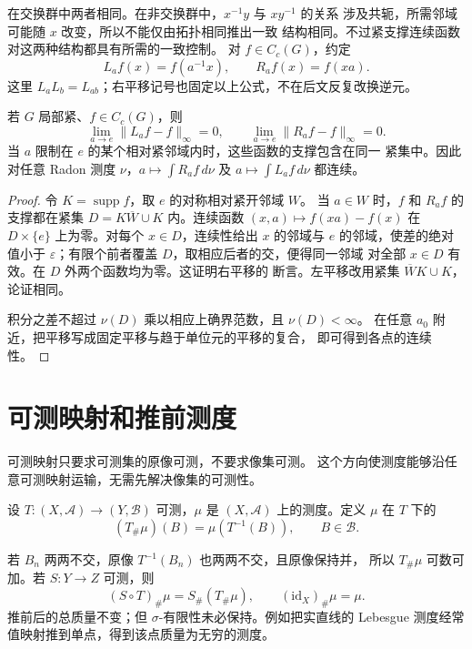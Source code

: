 在交换群中两者相同。在非交换群中，$x^{-1}y$ 与 $xy^{-1}$ 的关系
涉及共轭，所需邻域可能随 $x$ 改变，所以不能仅由拓扑相同推出一致
结构相同。不过紧支撑连续函数对这两种结构都具有所需的一致控制。
对 $f\in C_c(G)$，约定
\[
 L_af(x)=f(a^{-1}x),\qquad R_af(x)=f(xa).
\]
这里 $L_aL_b=L_{ab}$；右平移记号也固定以上公式，不在后文反复改换逆元。

\begin{lemma}[平移的一致连续性]
\label{lem:haar-translation-continuity}
若 $G$ 局部紧、$f\in C_c(G)$，则
\[
 \lim_{a\to e}\|L_af-f\|_\infty=0,
 \qquad \lim_{a\to e}\|R_af-f\|_\infty=0.
\]
当 $a$ 限制在 $e$ 的某个相对紧邻域内时，这些函数的支撑包含在同一
紧集中。因此对任意 Radon 测度 $\nu$，$a\mapsto\int R_af\,d\nu$
及 $a\mapsto\int L_af\,d\nu$ 都连续。
\end{lemma}

\begin{proof}
令 $K=\operatorname{supp}f$，取 $e$ 的对称相对紧开邻域 $W$。
当 $a\in W$ 时，$f$ 和 $R_af$ 的支撑都在紧集
$D=K\overline W\cup K$ 内。连续函数
$(x,a)\mapsto f(xa)-f(x)$ 在 $D\times\{e\}$ 上为零。对每个
$x\in D$，连续性给出 $x$ 的邻域与 $e$ 的邻域，使差的绝对值小于
$\varepsilon$；有限个前者覆盖 $D$，取相应后者的交，便得同一邻域
对全部 $x\in D$ 有效。在 $D$ 外两个函数均为零。这证明右平移的
断言。左平移改用紧集 $\overline W K\cup K$，论证相同。

积分之差不超过 $\nu(D)$ 乘以相应上确界范数，且 $\nu(D)<\infty$。
在任意 $a_0$ 附近，把平移写成固定平移与趋于单位元的平移的复合，
即可得到各点的连续性。
\end{proof}

\section{可测映射和推前测度}
\label{sec:pushforward-measures}

可测映射只要求可测集的原像可测，不要求像集可测。
这个方向使测度能够沿任意可测映射运输，无需先解决像集的可测性。

\begin{definition}[推前测度]
设 $T:(X,\mathcal A)\to(Y,\mathcal B)$ 可测，$\mu$ 是
$(X,\mathcal A)$ 上的测度。定义 $\mu$ 在 $T$ 下的
\[
 (T_\#\mu)(B)=\mu(T^{-1}(B)),\qquad B\in\mathcal B.
\]
\end{definition}

若 $B_n$ 两两不交，原像 $T^{-1}(B_n)$ 也两两不交，且原像保持并，
所以 $T_\#\mu$ 可数可加。若 $S:Y\to Z$ 可测，则
\[
 (S\circ T)_\#\mu=S_\#(T_\#\mu),\qquad (\mathrm{id}_X)_\#\mu=\mu.
\]
推前后的总质量不变；但 $\sigma$-有限性未必保持。例如把实直线的
Lebesgue 测度经常值映射推到单点，得到该点质量为无穷的测度。

